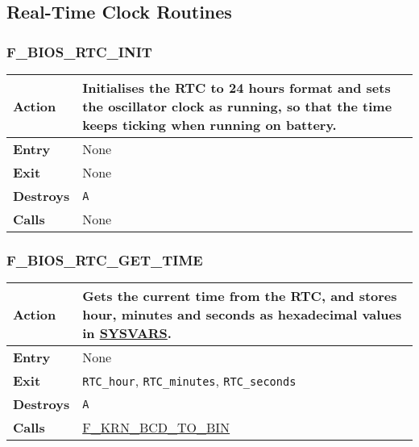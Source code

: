     \subsection{Real-Time Clock Routines}

        \subsubsection{F\_BIOS\_RTC\_INIT}
        \label{func:fbiosrtcinit}
        \begin{tabular}{l p{15cm}}
            \hline\textbf{Action}
            & Initialises the \textbf{RTC} to 24 hours format and sets the
            oscillator clock as running, so that the time keeps ticking when
            running on battery.\\
            \hline\textbf{Entry} & None \\
            \hline\textbf{Exit} & None \\
            \hline\textbf{Destroys} & \texttt{A} \\
            \hline\textbf{Calls} & None \\
            \hline
        \end{tabular}

        \subsubsection{F\_BIOS\_RTC\_GET\_TIME}
        \label{func:fbiosrtcgettime}
        \begin{tabular}{l p{15cm}}
            \hline\textbf{Action}
            & Gets the current time from the \textbf{RTC}, and stores hour,
            minutes and seconds as hexadecimal values in
            \hyperref[sec:ram_memmap]{SYSVARS}.\\
            \hline\textbf{Entry} & None \\
            \hline\textbf{Exit} & \texttt{RTC\_hour}, \texttt{RTC\_minutes},
            \texttt{RTC\_seconds} \\
            \hline\textbf{Destroys} & \texttt{A} \\
            \hline\textbf{Calls}
            & \hyperref[func:fkrnbcdtobin]{F\_KRN\_BCD\_TO\_BIN}\\
            \hline
        \end{tabular}

